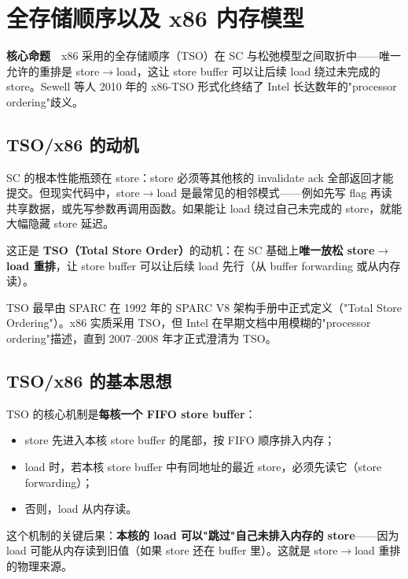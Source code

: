 \chapter{全存储顺序以及 x86 内存模型}

\begin{epigraph}
\textbf{核心命题}　x86 采用的全存储顺序（TSO）在 SC 与松弛模型之间取折中——唯一允许的重排是 store$\rightarrow$load，这让 store buffer 可以让后续 load 绕过未完成的 store。Sewell 等人 2010 年的 x86-TSO 形式化终结了 Intel 长达数年的"processor ordering"歧义。
\end{epigraph}



\section{TSO/x86 的动机}

SC 的根本性能瓶颈在 store：store 必须等其他核的 invalidate ack 全部返回才能提交。但现实代码中，store$\rightarrow$load 是最常见的相邻模式——例如先写 flag 再读共享数据，或先写参数再调用函数。如果能让 load 绕过自己未完成的 store，就能大幅隐藏 store 延迟。

这正是 \textbf{TSO（Total Store Order）}的动机：在 SC 基础上\textbf{唯一放松 store$\rightarrow$load 重排}，让 store buffer 可以让后续 load 先行（从 buffer forwarding 或从内存读）。

TSO 最早由 SPARC 在 1992 年的 SPARC V8 架构手册中正式定义（"Total Store Ordering"）。x86 实质采用 TSO，但 Intel 在早期文档中用模糊的"processor ordering"描述，直到 2007–2008 年才正式澄清为 TSO。

\section{TSO/x86 的基本思想}

TSO 的核心机制是\textbf{每核一个 FIFO store buffer}：

\begin{itemize}
\item store 先进入本核 store buffer 的尾部，按 FIFO 顺序排入内存；
\item load 时，若本核 store buffer 中有同地址的最近 store，必须先读它（store forwarding）；
\item 否则，load 从内存读。
\end{itemize}


这个机制的关键后果：\textbf{本核的 load 可以"跳过"自己未排入内存的 store}——因为 load 可能从内存读到旧值（如果 store 还在 buffer 里）。这就是 store$\rightarrow$load 重排的物理来源。

